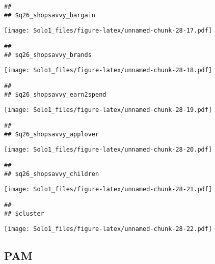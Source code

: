 \documentclass[]{article}
\newenvironment{Shaded}{\begin{snugshade}}{\end{snugshade}}
\newcommand{\KeywordTok}[1]{\textcolor[rgb]{0.13,0.29,0.53}{\textbf{#1}}}
\newcommand{\DataTypeTok}[1]{\textcolor[rgb]{0.13,0.29,0.53}{#1}}
\newcommand{\DecValTok}[1]{\textcolor[rgb]{0.00,0.00,0.81}{#1}}
\newcommand{\StringTok}[1]{\textcolor[rgb]{0.31,0.60,0.02}{#1}}
\newcommand{\OperatorTok}[1]{\textcolor[rgb]{0.81,0.36,0.00}{\textbf{#1}}}
\newcommand{\NormalTok}[1]{#1}
\begin{document}
\begin{verbatim}
## 
## $q26_shopsavvy_bargain
\end{verbatim}

\texttt{[image: Solo1\_files/figure-latex/unnamed-chunk-28-17.pdf]}

\begin{verbatim}
## 
## $q26_shopsavvy_brands
\end{verbatim}

\texttt{[image: Solo1\_files/figure-latex/unnamed-chunk-28-18.pdf]}

\begin{verbatim}
## 
## $q26_shopsavvy_earn2spend
\end{verbatim}

\texttt{[image: Solo1\_files/figure-latex/unnamed-chunk-28-19.pdf]}

\begin{verbatim}
## 
## $q26_shopsavvy_applover
\end{verbatim}

\texttt{[image: Solo1\_files/figure-latex/unnamed-chunk-28-20.pdf]}

\begin{verbatim}
## 
## $q26_shopsavvy_children
\end{verbatim}

\texttt{[image: Solo1\_files/figure-latex/unnamed-chunk-28-21.pdf]}

\begin{verbatim}
## 
## $cluster
\end{verbatim}

\texttt{[image: Solo1\_files/figure-latex/unnamed-chunk-28-22.pdf]}

\subsection{PAM}\label{pam}

\begin{Shaded}
\end{Shaded}
\end{document}
